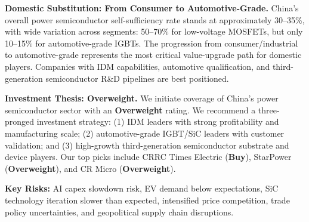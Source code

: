 \vspace{0.3em}

\textbf{Domestic Substitution: From Consumer to Automotive-Grade.} China's overall power semiconductor self-sufficiency rate stands at approximately 30–35\%, with wide variation across segments: 50–70\% for low-voltage MOSFETs, but only 10–15\% for automotive-grade IGBTs. The progression from consumer/industrial to automotive-grade represents the most critical value-upgrade path for domestic players. Companies with IDM capabilities, automotive qualification, and third-generation semiconductor R\&D pipelines are best positioned.

\vspace{0.3em}

\textbf{Investment Thesis: Overweight.} We initiate coverage of China's power semiconductor sector with an \textbf{Overweight} rating. We recommend a three-pronged investment strategy: (1) IDM leaders with strong profitability and manufacturing scale; (2) automotive-grade IGBT/SiC leaders with customer validation; and (3) high-growth third-generation semiconductor substrate and device players. Our top picks include CRRC Times Electric (\textbf{Buy}), StarPower (\textbf{Overweight}), and CR Micro (\textbf{Overweight}).

\vspace{0.3em}

\textbf{Key Risks:} AI capex slowdown risk, EV demand below expectations, SiC technology iteration slower than expected, intensified price competition, trade policy uncertainties, and geopolitical supply chain disruptions.
